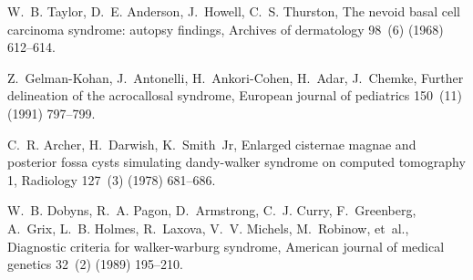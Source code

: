 \documentclass{article}
\theoremstyle{definition}
\begin{document}
\begin{thebibliography}{10}
W.~B. Taylor, D.~E. Anderson, J.~Howell, C.~S. Thurston, The nevoid basal cell
  carcinoma syndrome: autopsy findings, Archives of dermatology 98~(6) (1968)
  612--614.

Z.~Gelman-Kohan, J.~Antonelli, H.~Ankori-Cohen, H.~Adar, J.~Chemke, Further
  delineation of the acrocallosal syndrome, European journal of pediatrics
  150~(11) (1991) 797--799.

C.~R. Archer, H.~Darwish, K.~Smith~Jr, Enlarged cisternae magnae and posterior
  fossa cysts simulating dandy-walker syndrome on computed tomography 1,
  Radiology 127~(3) (1978) 681--686.

W.~B. Dobyns, R.~A. Pagon, D.~Armstrong, C.~J. Curry, F.~Greenberg, A.~Grix,
  L.~B. Holmes, R.~Laxova, V.~V. Michels, M.~Robinow, et~al., Diagnostic
  criteria for walker-warburg syndrome, American journal of medical genetics
  32~(2) (1989) 195--210.

\end{thebibliography}
\end{document}
